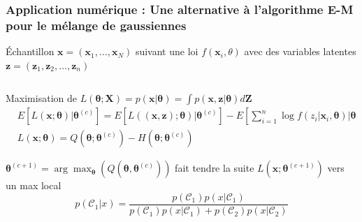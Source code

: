 \documentclass{presentation_template}
\begin{document}
\begin{frame}
    \frametitle{Application numérique : Une alternative à l'algorithme E-M pour le mélange de gaussiennes}

    \'Echantillon $\boldsymbol{x}=\left(\boldsymbol{x}_{1}, \ldots, \boldsymbol{x}_{N}\right)$ suivant une loi 
    $f\left(\boldsymbol{x}_{i}, \theta\right)$ 
    avec des variables latentes $\boldsymbol{z}=\left(\boldsymbol{z}_{1}, \boldsymbol{z}_{2}, \dots, \boldsymbol{z}_{n}\right)$\\
    
    \begin{columns}
        \begin{column}{0.8\textwidth}
            
            Maximisation de $L(\boldsymbol{\theta} ; \mathbf{X})=p(\mathbf{x} | \boldsymbol{\theta})=\int p(\mathbf{x}, \mathbf{z} | \boldsymbol{\theta}) d \mathbf{Z}$
            $\begin{aligned}
            & E\left[L(\mathbf{x} ; \boldsymbol{\theta}) | \boldsymbol{\theta}^{(c)}\right]=E\left[L((\mathbf{x}, \mathbf{z}) ; \boldsymbol{\theta}) | \boldsymbol{\theta}^{(c)}\right]-E\left[\sum_{i=1}^{n} \log f\left(z_{i} | \boldsymbol{x}_{i}, \boldsymbol{\theta}\right) | \boldsymbol{\theta}^{(c)}\right]\\
            &L(\mathbf{x} ; \boldsymbol{\theta})=Q\left(\boldsymbol{\theta} ; \boldsymbol{\theta}^{(c)}\right)-H\left(\boldsymbol{\theta} ; \boldsymbol{\theta}^{(c)}\right)
            \end{aligned}$
    
            $
            \boldsymbol{\theta}^{(c+1)}=\arg \max _{\boldsymbol{\theta}}\left(Q\left(\boldsymbol{\theta}, \boldsymbol{\theta}^{(c)}\right)\right)
            $ \hfill fait tendre la suite $L\left(\mathbf{x} ; \boldsymbol{\theta}^{(c+1)}\right)$ vers un max local  
            $$
            p\left(\mathcal{C}_{1} | x\right)=\frac{p\left(\mathcal{C}_{1}\right) p\left(x | \mathcal{C}_{1}\right)}{p\left(\mathcal{C}_{1}\right) p\left(x | \mathcal{C}_{1}\right)+p\left(\mathcal{C}_{2}\right) p\left(x | \mathcal{C}_{2}\right)}
            $$
    \end{column}


\end{columns}
\end{frame}
\end{document}
